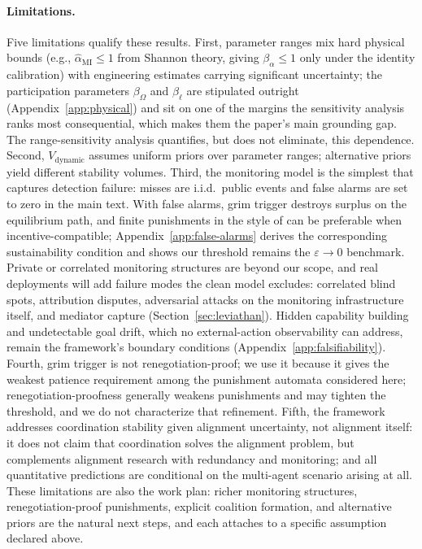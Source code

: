 \documentclass[manuscript,screen,review]{jair}
\begin{document}
\paragraph{Limitations.}
Five limitations qualify these results. First, parameter ranges mix hard physical bounds (e.g., $\hat\alpha_{\mathrm{MI}} \leq 1$ from Shannon theory, giving $\beta_\alpha \leq 1$ only under the identity calibration) with engineering estimates carrying significant uncertainty; the participation parameters $\beta_\Omega$ and $\beta_\ell$ are stipulated outright (Appendix~\ref{app:physical}) and sit on one of the margins the sensitivity analysis ranks most consequential, which makes them the paper's main grounding gap. The range-sensitivity analysis quantifies, but does not eliminate, this dependence. Second, $V_{\mathrm{dynamic}}$ assumes uniform priors over parameter ranges; alternative priors yield different stability volumes. Third, the monitoring model is the simplest that captures detection failure: misses are i.i.d.\ public events and false alarms are set to zero in the main text. With false alarms, grim trigger destroys surplus on the equilibrium path, and finite punishments in the style of \citet{green.porter.1984} can be preferable when incentive-compatible; Appendix~\ref{app:false-alarms} derives the corresponding sustainability condition and shows our threshold remains the $\varepsilon \to 0$ benchmark. Private or correlated monitoring structures \cite{kandori.obara.2006,sugaya.wolitzky.2017} are beyond our scope, and real deployments will add failure modes the clean model excludes: correlated blind spots, attribution disputes, adversarial attacks on the monitoring infrastructure itself, and mediator capture (Section~\ref{sec:leviathan}). Hidden capability building and undetectable goal drift, which no external-action observability can address, remain the framework's boundary conditions (Appendix~\ref{app:falsifiability}). Fourth, grim trigger is not renegotiation-proof; we use it because it gives the weakest patience requirement among the punishment automata considered here; renegotiation-proofness generally weakens punishments and may tighten the threshold, and we do not characterize that refinement. Fifth, the framework addresses coordination stability given alignment uncertainty, not alignment itself: it does not claim that coordination solves the alignment problem, but complements alignment research with redundancy and monitoring; and all quantitative predictions are conditional on the multi-agent scenario arising at all. These limitations are also the work plan: richer monitoring structures, renegotiation-proof punishments, explicit coalition formation, and alternative priors are the natural next steps, and each attaches to a specific assumption declared above.
\end{document}
